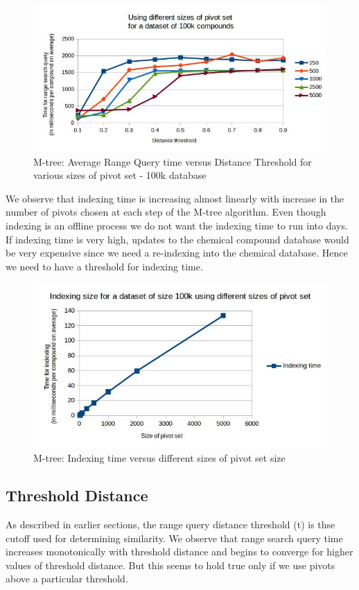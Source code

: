 \begin{figure}[ht!]	
\centering
\includegraphics[width=1 \columnwidth]{img/image4.jpg}
\caption{M-tree: Average Range Query time versus Distance Threshold for various sizes of pivot set - 100k database}
\label{fig:5.5}
\end{figure}


We observe that indexing time is increasing almost linearly with increase in the number of pivots chosen at each step of the M-tree algorithm. Even though indexing is an offline process we do not want the indexing time to run into days. If indexing time is very high, updates to the chemical compound database would be very expensive since we need a re-indexing into the chemical database. Hence we need to have a threshold for indexing time.

\begin{figure}[ht!]	
\centering
\includegraphics[width=1 \columnwidth]{img/image7.jpg}
\caption{M-tree: Indexing time versus different sizes of pivot set size}
\label{fig:5.6}
\end{figure}



\subsection{Threshold Distance}
As described in earlier sections, the range query distance threshold (t) is thse cutoff used for determining similarity. We observe that range search query time increases monotonically with threshold distance and begins to converge for higher values of threshold distance.  But this seems to hold true only if we use pivots above a particular threshold. 

